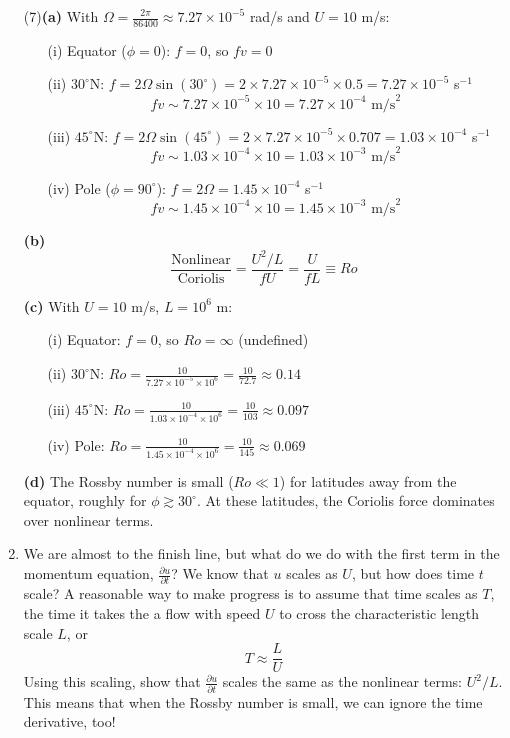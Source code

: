 \documentclass[letterpaper, 11pt]{article}
\newcommand{\1}{\mathds{1}}	%
\theoremstyle{definition}
\begin{document}
\begin{enumerate}[resume]
(7)\textbf{(a)} With $\Omega = \frac{2\pi}{86400} \approx 7.27 \times 10^{-5}$ rad/s and $U = 10$ m/s:

\begin{itemize}
\item[(i)] Equator ($\phi = 0$): $f = 0$, so $fv = 0$
\item[(ii)] $30^\circ$N: $f = 2\Omega\sin(30^\circ) = 2 \times 7.27 \times 10^{-5} \times 0.5 = 7.27 \times 10^{-5}$ s$^{-1}$
\[
fv \sim 7.27 \times 10^{-5} \times 10 = 7.27 \times 10^{-4} \text{ m/s}^2
\]
\item[(iii)] $45^\circ$N: $f = 2\Omega\sin(45^\circ) = 2 \times 7.27 \times 10^{-5} \times 0.707 = 1.03 \times 10^{-4}$ s$^{-1}$
\[
fv \sim 1.03 \times 10^{-4} \times 10 = 1.03 \times 10^{-3} \text{ m/s}^2
\]
\item[(iv)] Pole ($\phi = 90^\circ$): $f = 2\Omega = 1.45 \times 10^{-4}$ s$^{-1}$
\[
fv \sim 1.45 \times 10^{-4} \times 10 = 1.45 \times 10^{-3} \text{ m/s}^2
\]
\end{itemize}

\textbf{(b)} 
\[
\frac{\text{Nonlinear}}{\text{Coriolis}} = \frac{U^2/L}{fU} = \boxed{\frac{U}{fL} \equiv Ro}
\]

\textbf{(c)} With $U = 10$ m/s, $L = 10^6$ m:

\begin{itemize}
\item[(i)] Equator: $f = 0$, so $Ro = \infty$ (undefined)
\item[(ii)] $30^\circ$N: $Ro = \frac{10}{7.27 \times 10^{-5} \times 10^6} = \frac{10}{72.7} \approx 0.14$
\item[(iii)] $45^\circ$N: $Ro = \frac{10}{1.03 \times 10^{-4} \times 10^6} = \frac{10}{103} \approx 0.097$
\item[(iv)] Pole: $Ro = \frac{10}{1.45 \times 10^{-4} \times 10^6} = \frac{10}{145} \approx 0.069$
\end{itemize}

\textbf{(d)} The Rossby number is small ($Ro \ll 1$) for latitudes away from the equator, roughly for $\phi \gtrsim 30^\circ$. At these latitudes, the Coriolis force dominates over nonlinear terms.

\item We are almost to the finish line, but what do we do with the first term in the momentum equation, $\frac{\partial u}{\partial t}$? We know that $u$ scales as $U$, but how does time $t$ scale? A reasonable way to make progress is to assume that time scales as $T$, the time it takes the a flow with speed $U$ to cross the characteristic length scale $L$, or
\[
T \approx \frac{L}{U}
\]
Using this scaling, show that $\frac{\partial u}{\partial t}$ scales the same as the nonlinear terms: $U^2/L$. This means that when the Rossby number is small, we can ignore the time derivative, too!



\end{enumerate}
\end{document}
